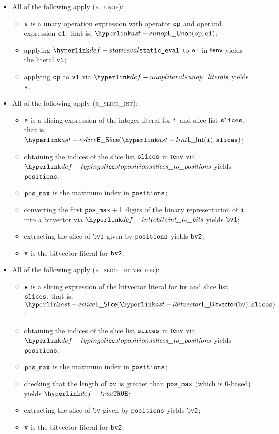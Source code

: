 \begin{itemize}
  \item All of the following apply (\textsc{e\_unop}):
  \begin{itemize}
    \item $\texttt{e}$ is a unary operation expression with operator $\texttt{op}$ and operand expression $\texttt{e1}$,
          that is, $\EUnop(\op, \veone)$;
    \item applying $\staticeval$ to $\texttt{e1}$ in $\textsf{tenv}$ yields the literal $\texttt{v1}$\ProseTerminateAs{\CannotBeTransformed, \TypeErrorConfig};
    \item applying $\texttt{op}$ to $\texttt{v1}$ via $\unopliterals$ yields $\texttt{v}$\ProseOrTypeError.
  \end{itemize}

  \item All of the following apply (\textsc{e\_slice\_int}):
  \begin{itemize}
    \item $\texttt{e}$ is a slicing expression of the integer literal for $\texttt{i}$ and slice list $\texttt{slices}$, that is,
          $\ESlice(\lint(\vi), \vslices)$;
    \item obtaining the indices of the slice list $\texttt{slices}$ in $\textsf{tenv}$ via $\typingslicestopositions$
          yields $\texttt{positions}$\ProseOrTypeError;
    \item $\texttt{pos\_max}$ is the maximum index in $\texttt{positions}$;
    \item converting the first $\texttt{pos\_max}+1$ digits of the binary representation of $\texttt{i}$ into a bitvector
          via $\inttobits$ yields $\texttt{bv1}$;
    \item extracting the slice of $\texttt{bv1}$ given by $\texttt{positions}$ yields $\texttt{bv2}$\ProseOrTypeError;
    \item $\texttt{v}$ is the bitvector literal for $\texttt{bv2}$.
  \end{itemize}

  \item All of the following apply (\textsc{e\_slice\_bitvector}):
  \begin{itemize}
    \item $\texttt{e}$ is a slicing expression of the bitvector literal for $\texttt{bv}$ and slice list $\texttt{slices}$, that is,
          $\ESlice(\lbitvector(\bv), \vslices)$;
    \item obtaining the indices of the slice list $\texttt{slices}$ in $\textsf{tenv}$ via $\typingslicestopositions$
          yields $\texttt{positions}$\ProseOrTypeError;
    \item $\texttt{pos\_max}$ is the maximum index in $\texttt{positions}$;
    \item checking that the length of $\texttt{bv}$ is greater than $\texttt{pos\_max}$ (which is $0$-based) yields $\True$\ProseOrTypeError;
    \item extracting the slice of $\texttt{bv}$ given by $\texttt{positions}$ yields $\texttt{bv2}$\ProseOrTypeError;
    \item $\texttt{v}$ is the bitvector literal for $\texttt{bv2}$.
  \end{itemize}


\end{itemize}
